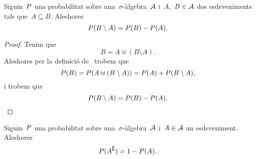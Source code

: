 \documentclass[../Apunts.tex]{subfiles}
\begin{document}
	\begin{proposition}
		\label{prop:probabilitat de la resta de esdeveniments}
		Siguin~\(P\) una probabilitat sobre una~\(\sigma\)-àlgebra~\(\mathcal{A}\) i~\(A\),~\(B\in\mathcal{A}\) dos esdeveniments tals que~\(A\subseteq B\). Aleshores
		\[P(B\setminus A)=P(B)-P(A).\]
		\begin{proof}
			Tenim que
			\[B=A\uplus(B\setminus A).\]
			Aleshores per la definició de~ trobem que
			\[P(B)=P(A\uplus(B\setminus A))=P(A)+P(B\setminus A),\]
			i trobem que
			\[P(B\setminus A)=P(B)-P(A).\]
		\end{proof}
	\end{proposition}
	\begin{corollary}
		\label{cor:probabilitat del complementari}
		Siguin~\(P\) una probabilitat sobre una~\(\sigma\)-àlgebra~\(\mathcal{A}\) i~\(A\in\mathcal{A}\) un esdeveniment. Aleshores
		\[P(A^{\complement})=1-P(A).\qedhere\]
	\end{corollary}
\end{document}
